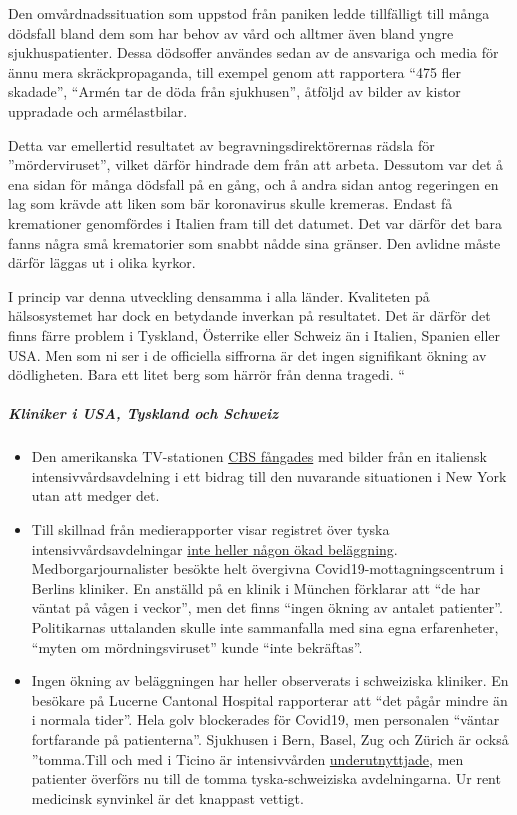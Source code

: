 Den omvårdnadssituation som uppstod från paniken ledde tillfälligt till
många dödsfall bland dem som har behov av vård och alltmer även bland
yngre sjukhuspatienter. Dessa dödsoffer användes sedan av de ansvariga
och media för ännu mera skräckpropaganda, till exempel genom att
rapportera ``475 fler skadade'', ``Armén tar de döda från sjukhusen'',
åtföljd av bilder av kistor uppradade och armélastbilar.

Detta var emellertid resultatet av begravningsdirektörernas rädsla för
''mörderviruset'', vilket därför hindrade dem från att arbeta. Dessutom
var det å ena sidan för många dödsfall på en gång, och å andra sidan
antog regeringen en lag som krävde att liken som bär koronavirus skulle
kremeras. Endast få kremationer genomfördes i Italien fram till det
datumet. Det var därför det bara fanns några små krematorier som snabbt
nådde sina gränser. Den avlidne måste därför läggas ut i olika kyrkor.

I princip var denna utveckling densamma i alla länder. Kvaliteten på
hälsosystemet har dock en betydande inverkan på resultatet. Det är
därför det finns färre problem i Tyskland, Österrike eller Schweiz än i
Italien, Spanien eller USA. Men som ni ser i de officiella siffrorna är
det ingen signifikant ökning av dödligheten. Bara ett litet berg som
härrör från denna tragedi. ``

\hypertarget{kliniker-i-usa-tyskland-och-schweiz}{%
\subparagraph{\texorpdfstring{\textbf{Kliniker i USA, Tyskland och
Schweiz}}{Kliniker i USA, Tyskland och Schweiz}}\label{kliniker-i-usa-tyskland-och-schweiz}}

\begin{itemize}
\tightlist
\item
  Den amerikanska TV-stationen
  \href{https://www.theblaze.com/news/cbs-news-footage-italy-hospital-nyc}{CBS
  fångades} med bilder från en italiensk intensivvårdsavdelning i ett
  bidrag till den nuvarande situationen i New York utan att medger det.
\item
  Till skillnad från medierapporter visar registret över tyska
  intensivvårdsavdelningar
  \href{https://www.divi.de/register/intensivregister}{inte heller någon
  ökad beläggning}. Medborgarjournalister besökte helt övergivna
  Covid19-mottagningscentrum i Berlins kliniker. En anställd på en
  klinik i München förklarar att ``de har väntat på vågen i veckor'',
  men det finns ``ingen ökning av antalet patienter''. Politikarnas
  uttalanden skulle inte sammanfalla med sina egna erfarenheter, ``myten
  om mördningsviruset'' kunde ``inte bekräftas''.
\item
  Ingen ökning av beläggningen har heller observerats i schweiziska
  kliniker. En besökare på Lucerne Cantonal Hospital rapporterar att
  ``det pågår mindre än i normala tider''. Hela golv blockerades för
  Covid19, men personalen ``väntar fortfarande på patienterna''.
  Sjukhusen i Bern, Basel, Zug och Zürich är också ''tomma.Till och med
  i Ticino är intensivvården
  \href{https://www.nzz.ch/schweiz/tessin-verlegt-erste-corona-patienten-in-deutschschweizer-spitaeler-ld.1549417}{underutnyttjade},
  men patienter överförs nu till de tomma tyska-schweiziska
  avdelningarna. Ur rent medicinsk synvinkel är det knappast vettigt.
\end{itemize}

